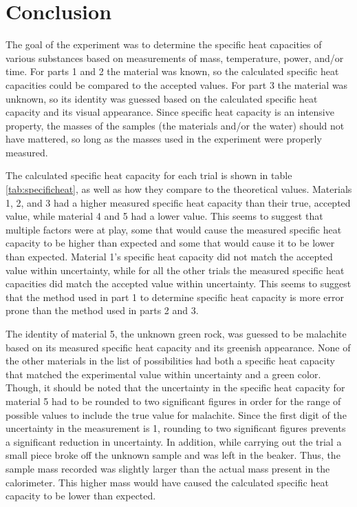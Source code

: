 \documentclass[12pt]{iopart} %
\begin{document}
\section{Conclusion}

The goal of the experiment was to determine the specific heat capacities of various substances based on measurements of mass, temperature, power, and/or time.
For parts 1 and 2 the material was known, so the calculated specific heat capacities could be compared to the accepted values.
For part 3 the material was unknown, so its identity was guessed based on the calculated specific heat capacity and its visual appearance.
Since specific heat capacity is an intensive property, the masses of the samples (the materials and/or the water) should not have mattered, so long as the masses used in the experiment were properly measured.

The calculated specific heat capacity for each trial is shown in table \ref{tab:specificheat}, as well as how they compare to the theoretical values.
Materials 1, 2, and 3 had a higher measured specific heat capacity than their true, accepted value, while material 4 and 5 had a lower value.
This seems to suggest that multiple factors were at play, some that would cause the measured specific heat capacity to be higher than expected and some that would cause it to be lower than expected.
Material 1's specific heat capacity did not match the accepted value within uncertainty, while for all the other trials the measured specific heat capacities did match the accepted value within uncertainty.
This seems to suggest that the method used in part 1 to determine specific heat capacity is more error prone than the method used in parts 2 and 3.

The identity of material 5, the unknown green rock, was guessed to be malachite based on its measured specific heat capacity and its greenish appearance.
None of the other materials in the list of possibilities had both a specific heat capacity that matched the experimental value within uncertainty and a green color.
Though, it should be noted that the uncertainty in the specific heat capacity for material 5 had to be rounded to two significant figures in order for the range of possible values to include the true value for malachite.
Since the first digit of the uncertainty in the measurement is 1, rounding to two significant figures prevents a significant reduction in uncertainty.
In addition, while carrying out the trial a small piece broke off the unknown sample and was left in the beaker.
Thus, the sample mass recorded was slightly larger than the actual mass present in the calorimeter.
This higher mass would have caused the calculated specific heat capacity to be lower than expected.
\end{document}
